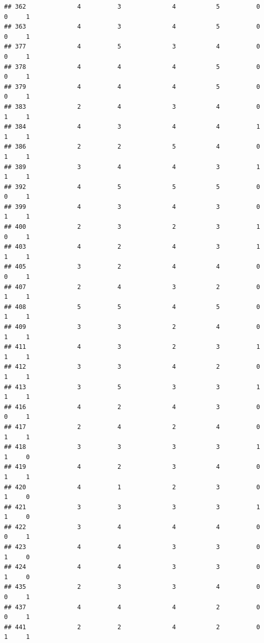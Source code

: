 \documentclass[
]{article}
\begin{document}
\begin{verbatim}
## 362              4          3              4           5          0    0     1
## 363              4          3              4           5          0    0     1
## 377              4          5              3           4          0    0     1
## 378              4          4              4           5          0    0     1
## 379              4          4              4           5          0    0     1
## 383              2          4              3           4          0    1     1
## 384              4          3              4           4          1    1     1
## 386              2          2              5           4          0    1     1
## 389              3          4              4           3          1    1     1
## 392              4          5              5           5          0    0     1
## 399              4          3              4           3          0    1     1
## 400              2          3              2           3          1    0     1
## 403              4          2              4           3          1    1     1
## 405              3          2              4           4          0    0     1
## 407              2          4              3           2          0    1     1
## 408              5          5              4           5          0    1     1
## 409              3          3              2           4          0    1     1
## 411              4          3              2           3          1    1     1
## 412              3          3              4           2          0    1     1
## 413              3          5              3           3          1    1     1
## 416              4          2              4           3          0    0     1
## 417              2          4              2           4          0    1     1
## 418              3          3              3           3          1    1     0
## 419              4          2              3           4          0    1     1
## 420              4          1              2           3          0    1     0
## 421              3          3              3           3          1    1     0
## 422              3          4              4           4          0    0     1
## 423              4          4              3           3          0    1     0
## 424              4          4              3           3          0    1     0
## 435              2          3              3           4          0    0     1
## 437              4          4              4           2          0    0     1
## 441              2          2              4           2          0    1     1

\end{verbatim}
\end{document}
